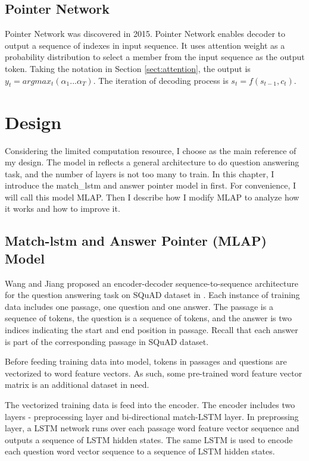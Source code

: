 \documentclass[modernstyle,12pt]{sjsuthesis}
\theoremstyle{definition}
\begin{document}
\section{Pointer Network}\label{sect:pointerNet}

Pointer Network\cite{vinyals2015pointer} was discovered in 2015. Pointer Network enables decoder to output a sequence of indexes in input sequence. It uses attention weight as a probability distribution to select a member from the input sequence as the output token. Taking the notation in Section \ref{sect:attention}, the output is $y_t = argmax_t{(\alpha _1 ... \alpha _T)}$. The iteration of decoding process is $s_t =f(s_{t-1},c_t)$.




\chapter{Design}\label{chap:design}

Considering the limited computation resource, I choose \cite{wang2016machine} as the main reference of my design. The model in \cite{wang2016machine} reflects a general architecture to do question answering task, and the number of layers is not too many to train. In this chapter, I introduce the match\_lstm and answer pointer model in \cite{wang2016machine} first. For convenience, I will call this model MLAP. Then I describe how I modify MLAP to analyze how it works and how to improve it.


\section{Match-lstm and Answer Pointer (MLAP) Model}

Wang and Jiang  proposed an encoder-decoder sequence-to-sequence architecture for the question answering task on SQuAD dataset in \cite{wang2016machine}. Each instance of training data includes one passage, one question and one answer. The passage is a sequence of tokens, the question is a sequence of tokens, and the answer is two indices indicating the start and end position in passage. Recall that each answer is part of the corresponding passage in SQuAD dataset.

Before feeding training data into model, tokens in passages and questions are vectorized to word feature vectors. As such, some pre-trained word feature vector matrix is an additional dataset in need.

The vectorized training data is feed into the encoder. The encoder includes two layers - preprocessing layer and bi-directional match-LSTM layer. In preprossing layer, a LSTM network runs over each passage word feature vector sequence and outputs a sequence of LSTM hidden states. The same LSTM is used to encode each question word vector sequence to a sequence of LSTM hidden states.
\end{document}
